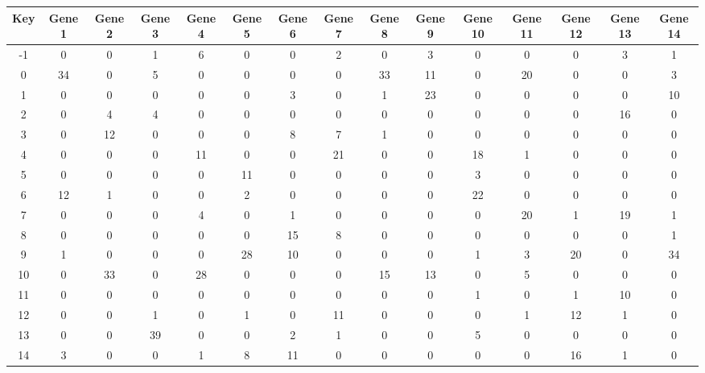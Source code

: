 \begin{tabular}{|c|c|c|c|c|c|c|c|c|c|c|c|c|c|c|}
\hline
Key & Gene 1 & Gene 2 & Gene 3 & Gene 4 & Gene 5 & Gene 6 & Gene 7 & Gene 8 & Gene 9 & Gene 10 & Gene 11 & Gene 12 & Gene 13 & Gene 14 \\
\hline
-1 & 0 & 0 & 1 & 6 & 0 & 0 & 2 & 0 & 3 & 0 & 0 & 0 & 3 & 1 \\
0 & 34 & 0 & 5 & 0 & 0 & 0 & 0 & 33 & 11 & 0 & 20 & 0 & 0 & 3 \\
1 & 0 & 0 & 0 & 0 & 0 & 3 & 0 & 1 & 23 & 0 & 0 & 0 & 0 & 10 \\
2 & 0 & 4 & 4 & 0 & 0 & 0 & 0 & 0 & 0 & 0 & 0 & 0 & 16 & 0 \\
3 & 0 & 12 & 0 & 0 & 0 & 8 & 7 & 1 & 0 & 0 & 0 & 0 & 0 & 0 \\
4 & 0 & 0 & 0 & 11 & 0 & 0 & 21 & 0 & 0 & 18 & 1 & 0 & 0 & 0 \\
5 & 0 & 0 & 0 & 0 & 11 & 0 & 0 & 0 & 0 & 3 & 0 & 0 & 0 & 0 \\
6 & 12 & 1 & 0 & 0 & 2 & 0 & 0 & 0 & 0 & 22 & 0 & 0 & 0 & 0 \\
7 & 0 & 0 & 0 & 4 & 0 & 1 & 0 & 0 & 0 & 0 & 20 & 1 & 19 & 1 \\
8 & 0 & 0 & 0 & 0 & 0 & 15 & 8 & 0 & 0 & 0 & 0 & 0 & 0 & 1 \\
9 & 1 & 0 & 0 & 0 & 28 & 10 & 0 & 0 & 0 & 1 & 3 & 20 & 0 & 34 \\
10 & 0 & 33 & 0 & 28 & 0 & 0 & 0 & 15 & 13 & 0 & 5 & 0 & 0 & 0 \\
11 & 0 & 0 & 0 & 0 & 0 & 0 & 0 & 0 & 0 & 1 & 0 & 1 & 10 & 0 \\
12 & 0 & 0 & 1 & 0 & 1 & 0 & 11 & 0 & 0 & 0 & 1 & 12 & 1 & 0 \\
13 & 0 & 0 & 39 & 0 & 0 & 2 & 1 & 0 & 0 & 5 & 0 & 0 & 0 & 0 \\
14 & 3 & 0 & 0 & 1 & 8 & 11 & 0 & 0 & 0 & 0 & 0 & 16 & 1 & 0 \\
\hline
\end{tabular}